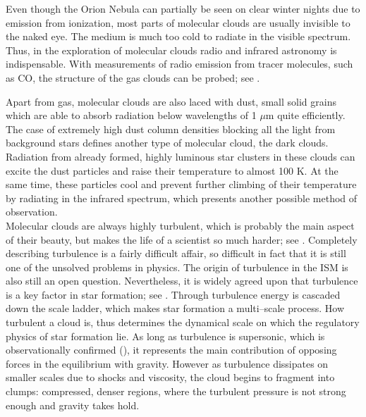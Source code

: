 Even though the Orion Nebula can partially be seen on clear winter nights due to emission from ionization, most parts of molecular clouds are usually invisible to the naked eye.
The medium is much too cold to radiate in the visible spectrum.
Thus, in the exploration of molecular clouds radio and infrared astronomy is indispensable.
With measurements of radio emission from tracer molecules, such as CO, the structure of the gas clouds can be probed; see \citet{CO_tracing, Lada, Cham_cores_ALMA, Orion_cores}.

Apart from gas, molecular clouds are also laced with dust, small solid grains which are able to absorb radiation below wavelengths of 1 $\mu$m quite efficiently.
The case of extremely high dust column densities blocking all the light from background stars defines another type of molecular cloud, the dark clouds.
Radiation from already formed, highly luminous star clusters in these clouds can excite the dust particles and raise their temperature to almost 100 K.
At the same time, these particles cool and prevent further climbing of their temperature by radiating in the infrared spectrum, which presents another possible method of observation.
\\[6pt]
%
Molecular clouds are always highly turbulent, which is probably the main aspect of their beauty, but makes the life of a scientist so much harder; see \citet{Turbulence, KolmogorovC,KolmogorovB,KolmogorovA}.
Completely describing turbulence is a fairly difficult affair, so difficult in fact that it is still one of the unsolved problems in physics.
The origin of turbulence in the ISM is also still an open question.
Nevertheless, it is widely agreed upon that turbulence is a key factor in star formation; see \citet{Turbulence_key}.
Through turbulence energy is cascaded down the scale ladder, which makes star formation a multi--scale process.
How turbulent a cloud is, thus determines the dynamical scale on which the regulatory physics of star formation lie.
As long as turbulence is supersonic, which is observationally confirmed (\citealt{Turbulence_supersonic}), it represents the main contribution of opposing forces in the equilibrium with gravity.
However as turbulence dissipates on smaller scales due to shocks and viscosity, the cloud begins to fragment into clumps: compressed, denser regions, where the turbulent pressure is not strong enough and gravity takes hold.
